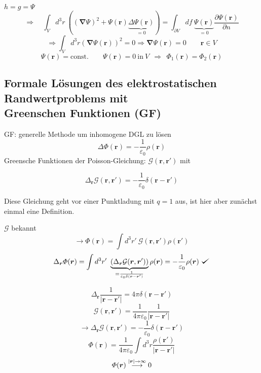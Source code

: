 \documentclass[titlepage,11pt,a4paper,ngerman]{report}
\def\checkmark{\tikz\fill[scale=0.4](0,.35) -- (.25,0) -- (1,.7) -- (.25,.15) -- cycle;}
\newcommand{\tx}[1]{\textrm{#1}}
\newcommand{\const}{\tx{const.}}
\newcommand{\gre}{\mathcal{G}}
\newcommand{\pofr}{\Phi(\vec{r})}
\renewcommand{\Phi}{\varPhi}
\renewcommand{\vec}[1]{\boldsymbol{#1}}
\newcommand{\lcom}[1]{\color{MidnightBlue}#1\color{black}}
\renewcommand{\epsilon}{\varepsilon}
\newcommand{\vabla}{\boldsymbol{\nabla}}
\newcommand{\frbox}[2]{\begin{tcolorbox}[colback=white,colframe=red!75!black,fonttitle=\bfseries,title=#1]#2\end{tcolorbox}}
\begin{document}
$h = g = \varPsi$
$$\Rightarrow \quad \int_V d^3 r\ ((\vabla \varPsi)^2 + \varPsi(\vec{r}) \underbrace{\Delta \varPsi(\vec{r})}_{=0}) = \int_{\partial V} df\ \underbrace{\varPsi(\vec{r})}_{=0} \frac{\partial \varPsi(\vec{r})}{\partial n} $$
\begin{equation*}
\Rightarrow \int_V d^3 r \left(\vec{\nabla} \varPsi(\vec{r}) \right)^2 = 0 \Rightarrow \vec{\nabla} \varPsi(\vec{r}) = 0 \qquad \vec{r} \in V
\end{equation*}
\begin{equation*}
\varPsi(\vec{r}) = \const \qquad \varPsi(\vec{r}) = 0 \ \tx{in} \ V \ \ \Rightarrow \ \ \Phi_1(\vec{r}) = \Phi_2(\vec{r})
\end{equation*}

\subsection{Formale Lösungen des elektrostatischen Randwertproblems mit \\ Greenschen Funktionen (GF)}
GF: generelle Methode um inhomogene DGL zu lösen
\begin{equation*}
\Delta \pofr = - \frac{1}{\epsilon_0} \rho(\vec{r})
\end{equation*}
Greensche Funktionen der Poisson-Gleichung: $ \gre(\vec{r},\vec{r}') $ mit
\frbox{Greensche Funktionen der Poisson-Gleichung}{\begin{equation*}
\Delta_{\vec{r}} \gre(\vec{r},\vec{r}') = - \frac{1}{\epsilon_0} \delta(\vec{r} - \vec{r}')
\end{equation*}}
\noindent
\lcom{Diese Gleichung geht vor einer Punktladung mit $ q=1 $ aus, ist hier aber zunächst einmal eine Definition.}

$\mathcal G$ bekannt 
$$\rightarrow \pofr = \int d^3 r'\ \mathcal G(\vec{r}, \vec{r}') \rho(\vec{r}')$$
$$\Delta_{\vec{r}} \pofr = \int d^3 r'\ \underbrace{(\Delta_{\vec{r}} \mathcal G(\vec{r}, \vec{r}'))}_{= \frac{1}{\epsilon_0 \delta(\vec{r}-\vec{r}')}} \rho (\vec{r}) = - \frac{1}{\epsilon_0} \rho (\vec{r})\ \checkmark$$

\begin{equation*}
\Delta_{\vec{r}} \frac{1}{|\vec{r} - \vec{r}'|} = 4 \pi \delta(\vec{r} - \vec{r}')
\end{equation*}
\begin{equation*}
\gre(\vec{r},\vec{r}') = \frac{1}{4 \pi \epsilon_0} \frac{1}{|\vec{r} - \vec{r}'|}
\end{equation*}
\begin{equation*}
\rightarrow \Delta_{\vec{r}} \gre(\vec{r}, \vec{r}') = - \frac{1}{\epsilon_0} \delta(\vec{r} - \vec{r}')
\end{equation*}
\begin{equation*}
\pofr = \frac{1}{4 \pi \epsilon_0} \int d^3 r \frac{\rho(\vec{r}')}{|\vec{r} - \vec{r}'|}
\end{equation*}
\begin{equation*}
\pofr \buildrel |\vec{r}| \to \infty \over \longrightarrow 0
\end{equation*}
\end{document}
